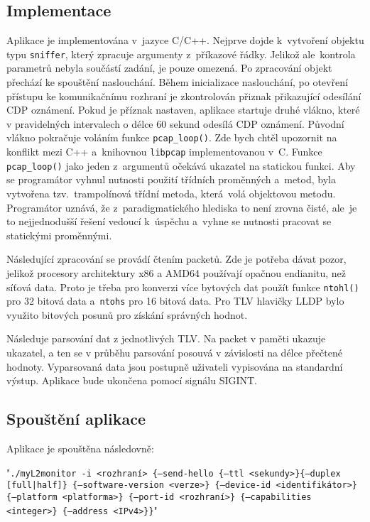 \documentclass[a4paper,12pt]{article}
\begin{document}
	\subsection{Implementace}
		Aplikace je implementována v~jazyce C/C++. Nejprve dojde k~vytvoření objektu typu \texttt{sniffer}, který zpracuje argumenty z~příkazové řádky. Jelikož ale~kontrola parametrů nebyla součástí zadání, je pouze omezená. Po zpracování objekt přechází ke spouštění naslouchání. Během inicializace naslouchání, po otevření přístupu ke komunikačnímu rozhraní je zkontrolován přiznak přikazující odesílání CDP oznámení. Pokud je příznak nastaven, aplikace startuje druhé vlákno, které v pravidelných intervalech o délce 60 sekund odesílá CDP oznámení. Původní vlákno pokračuje voláním funkce \texttt{pcap\_loop()}. Zde bych chtěl upozornit na konflikt mezi C++ a~knihovnou \texttt{libpcap} implementovanou v~C. Funkce \texttt{pcap\_loop()} jako jeden z~argumentů očekává ukazatel na statickou funkci. Aby se programátor vyhnul nutnosti použití třídních proměnných a~metod, byla vytvořena tzv.~trampolínová třídní metoda, která~volá objektovou metodu. Programátor uznává, že z~paradigmatického hlediska to není zrovna čisté, ale~je to nejjednodušší řešení vedoucí k~úspěchu a~vyhne se nutnosti pracovat se statickými proměnnými.\par
		
		Následující zpracování se provádí čtením packetů. Zde je potřeba dávat pozor, jelikož procesory architektury x86 a AMD64 používají opačnou endianitu, než síťová data. Proto je třeba pro konverzi více bytových dat použít funkce \texttt{ntohl()} pro 32 bitová data a~\texttt{ntohs} pro 16 bitová data. Pro TLV hlavičky LLDP bylo využito bitových posunů pro získání správných hodnot.
		\par
		Následuje parsování dat z jednotlivých TLV. Na packet v paměti ukazuje ukazatel, a ten se v průběhu parsování posouvá v závislosti na délce přečtené hodnoty. Vyparsovaná data jsou postupně uživateli vypisována na standardní výstup. Aplikace bude ukončena pomocí signálu SIGINT.
		
	\subsection{Spouštění aplikace}
		Aplikace je spouštěna následovně:\par
		"\texttt{./myL2monitor -i <rozhraní> \{--send-hello \{--ttl <sekundy>\}\{--duplex [full|half]\} \{--software-version <verze>\} \{--device-id <identifikátor>\} \{--platform <platforma>\} \{--port-id <rozhraní>\} \{--capabilities <integer>\} \{--address <IPv4>\}\}}" \cite{wis:zadani}\par
		
\end{document}
